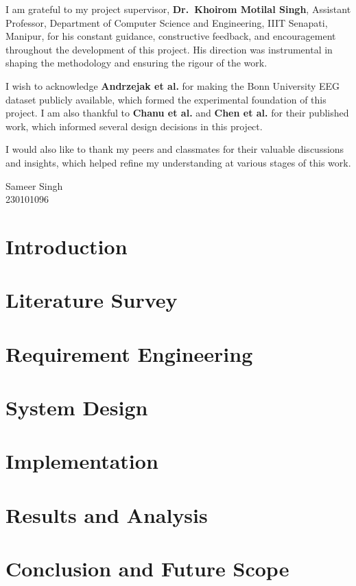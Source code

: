 \documentclass[a4paper, 11pt, oneside]{report}
\begin{document}
I am grateful to my project supervisor, \textbf{Dr.~Khoirom Motilal Singh}, Assistant Professor, Department of Computer Science and Engineering, IIIT Senapati, Manipur, for his constant guidance, constructive feedback, and encouragement throughout the development of this project. His direction was instrumental in shaping the methodology and ensuring the rigour of the work.

I wish to acknowledge \textbf{Andrzejak et al.} for making the Bonn University EEG dataset publicly available, which formed the experimental foundation of this project. I am also thankful to \textbf{Chanu et al.} and \textbf{Chen et al.} for their published work, which informed several design decisions in this project.

I would also like to thank my peers and classmates for their valuable discussions and insights, which helped refine my understanding at various stages of this work.

	\vspace{1cm}

	\hspace{9cm}Sameer Singh\\
	\hspace{9cm}230101096

	\newpage
	\tableofcontents
	\listoffigures
        \listoftables
	\chapter{Introduction}
	
        \chapter{Literature Survey}
        
        \chapter{Requirement Engineering}
        
        \chapter{System Design}
        
        \chapter{Implementation}
        
        \chapter{Results and Analysis}
        
        \chapter{Conclusion and Future Scope}
        

        
        
\end{document}
